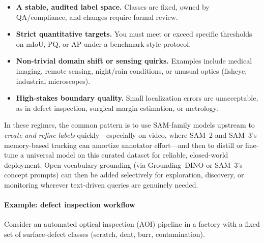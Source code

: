 \begin{enrichment}
	\begin{itemize}
		\item \textbf{A stable, audited label space.} Classes are fixed, owned by QA/compliance, and changes require formal review.
		\item \textbf{Strict quantitative targets.} You must meet or exceed specific thresholds on mIoU, PQ, or AP under a benchmark-style protocol.
		\item \textbf{Non-trivial domain shift or sensing quirks.} Examples include medical imaging, remote sensing, night/rain conditions, or unusual optics (fisheye, industrial microscopes).
		\item \textbf{High-stakes boundary quality.} Small localization errors are unacceptable, as in defect inspection, surgical margin estimation, or metrology.
	\end{itemize}
	
	In these regimes, the common pattern is to use SAM-family models upstream to \emph{create and refine labels} quickly---especially on video, where SAM~2 and SAM~3’s memory-based tracking can amortize annotator effort---and then to distill or fine-tune a universal model on this curated dataset for reliable, closed-world deployment. Open-vocabulary grounding (via Grounding~DINO or SAM~3’s concept prompts) can then be added selectively for exploration, discovery, or monitoring wherever text-driven queries are genuinely needed.
	
	\paragraph{Example: defect inspection workflow}
	Consider an automated optical inspection (AOI) pipeline in a factory with a fixed set of surface-defect classes (scratch, dent, burr, contamination).
	

\end{enrichment}
